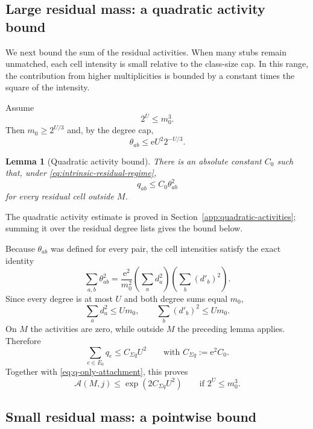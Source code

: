 \documentclass[a4paper,10pt,reqno]{amsart}
\numberwithin{equation}{section}
\theoremstyle{plain}
\newtheorem{lemma}[theorem]{Lemma}
\theoremstyle{remark}
\begin{document}
\subsection{Large residual mass: a quadratic activity bound}

We next bound the sum of the residual activities. When many stubs remain
unmatched, each cell intensity is small relative to the class-size cap.
In this range, the contribution from higher multiplicities is bounded
by a constant times the square of the intensity.

Assume
\begin{equation}
  2^U\le m_0^3.
  \label{eq:intrinsic-residual-regime}
\end{equation}
Then $m_0\ge2^{U/3}$ and, by the degree cap,
\[
  \theta_{ab}
  \le
  \mathrm e U^2 2^{-U/3}.
\]

\begin{lemma}[Quadratic activity bound]
\label{lem:q-quadratic}
There is an absolute constant $C_0$ such that, under
\eqref{eq:intrinsic-residual-regime},
\begin{equation}
  q_{ab}\le C_0\theta_{ab}^2
  \label{eq:q-quadratic}
\end{equation}
for every residual cell outside $M$.
\end{lemma}

The quadratic activity estimate is proved in Section~\ref{app:quadratic-activities}; summing it over the residual degree lists gives the bound below.

Because $\theta_{ab}$ was defined for every pair, the cell intensities satisfy
the exact identity
\[
  \sum_{a,b}\theta_{ab}^2
  =
  \frac{\mathrm e^2}{m_0^2}
  \left(\sum_a d_a^2\right)
  \left(\sum_b(d'_b)^2\right).
\]
Since every degree is at most $U$ and both degree sums equal $m_0$,
\[
  \sum_a d_a^2\le Um_0,
  \qquad
  \sum_b(d'_b)^2\le Um_0.
\]
On $M$ the activities are zero, while outside $M$ the preceding lemma applies.
Therefore
\begin{equation}
  \sum_{e\in E_0}q_e\le C_{\Sigma q}U^2
  \qquad\text{with }C_{\Sigma q}:=\mathrm e^2C_0.
  \label{eq:total-q}
\end{equation}
Together with \eqref{eq:q-only-attachment}, this proves
\begin{equation}
  \mathcal A(M,j)\le\exp(2C_{\Sigma q}U^2)
  \qquad\text{if }2^U\le m_0^3.
  \label{eq:intrinsic-attachment}
\end{equation}

\subsection{Small residual mass: a pointwise bound}
\end{document}
